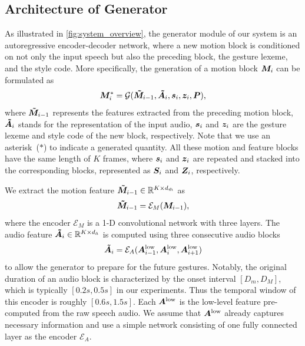 \subsection{Architecture of Generator}
As illustrated in \fig\ref{fig:system_overview}, the generator module of our system is an autoregressive encoder-decoder network, where a new motion block is conditioned on not only the input speech but also the preceding block, the gesture lexeme, and the style code. More specifically, the generation of a motion block $\bm{M}_{i}$ can be formulated as
\begin{equation}
    \bm{M}_{i}^*=\mathcal{G}(\bm{\tilde{M}}_{i-1},\bm{\tilde{A}}_{i},\bm{s}_i,\bm{z}_i,\bm{P}) \label{eqn:generator_block},
\end{equation}
where $\bm{\tilde{M}}_{i-1}$ represents the features extracted from the preceding motion block, $\bm{\tilde{A}}_{i}$ stands for the representation of the input audio, $\bm{s}_i$ and $\bm{z}_i$ are the gesture lexeme and style code of the new block, respectively. Note that we use an asterisk~($*$) to indicate a generated quantity. All these motion and feature blocks have the same length of $K$ frames, where $\bm{s}_i$ and $\bm{z}_i$ are repeated and stacked into the corresponding blocks, represented as $\bm{S}_i$ and $\bm{Z}_i$, respectively.

We extract the motion feature $\bm{\tilde{M}}_{i-1}\in\mathbb{R}^{K\times{}d_{\tilde{m}}}$ as 
\begin{equation}
    \bm{\tilde{M}}_{i-1} = \mathcal{E}_M(\bm{M}_{i-1}),
\end{equation}
where the encoder $\mathcal{E}_M$ is a 1-D convolutional network with three layers.
%
The audio feature $\bm{\tilde{A}}_{i}\in\mathbb{R}^{K\times{}d_{\tilde{a}}}$ is computed using three consecutive audio blocks
\begin{equation}
    \bm{\tilde{A}}_{i} = \mathcal{E}_A(\bm{A}^{{\text{low}}}_{i-1},\bm{A}^{{\text{low}}}_{i},\bm{A}^{{\text{low}}}_{i+1})
\end{equation}
to allow the generator to prepare for the future gestures. 
Notably, the original duration of an audio block is characterized by the onset interval $[D_m, D_M]$, which is typically $[0.2s, 0.5s]$ in our experiments. Thus the temporal window of this encoder is roughly $[0.6s, 1.5s]$.
Each $\bm{A}^{{\text{low}}}$ is the low-level feature pre-computed from the raw speech audio. We assume that $\bm{A}^{{\text{low}}}$ already captures necessary information and use a simple network consisting of one fully connected layer as the encoder $\mathcal{E}_A$.

